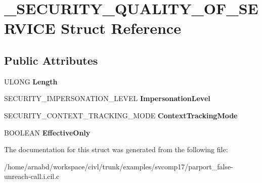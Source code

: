\hypertarget{struct__SECURITY__QUALITY__OF__SERVICE}{}\section{\+\_\+\+S\+E\+C\+U\+R\+I\+T\+Y\+\_\+\+Q\+U\+A\+L\+I\+T\+Y\+\_\+\+O\+F\+\_\+\+S\+E\+R\+V\+I\+C\+E Struct Reference}
\label{struct__SECURITY__QUALITY__OF__SERVICE}
\subsection*{Public Attributes}
\begin{DoxyCompactItemize}
\item 
\hypertarget{struct__SECURITY__QUALITY__OF__SERVICE_a8f4e4ca9a25a61e46d5a7bc754f3fb25}{}U\+L\+O\+N\+G {\bfseries Length}\label{struct__SECURITY__QUALITY__OF__SERVICE_a8f4e4ca9a25a61e46d5a7bc754f3fb25}

\item 
\hypertarget{struct__SECURITY__QUALITY__OF__SERVICE_ae0193db9a6f380415db53c5bc702b4e3}{}S\+E\+C\+U\+R\+I\+T\+Y\+\_\+\+I\+M\+P\+E\+R\+S\+O\+N\+A\+T\+I\+O\+N\+\_\+\+L\+E\+V\+E\+L {\bfseries Impersonation\+Level}\label{struct__SECURITY__QUALITY__OF__SERVICE_ae0193db9a6f380415db53c5bc702b4e3}

\item 
\hypertarget{struct__SECURITY__QUALITY__OF__SERVICE_a3501dda7ede19670b2b46138cc82707f}{}S\+E\+C\+U\+R\+I\+T\+Y\+\_\+\+C\+O\+N\+T\+E\+X\+T\+\_\+\+T\+R\+A\+C\+K\+I\+N\+G\+\_\+\+M\+O\+D\+E {\bfseries Context\+Tracking\+Mode}\label{struct__SECURITY__QUALITY__OF__SERVICE_a3501dda7ede19670b2b46138cc82707f}

\item 
\hypertarget{struct__SECURITY__QUALITY__OF__SERVICE_ac099321a3499f22a14c36b43ae5fcaf1}{}B\+O\+O\+L\+E\+A\+N {\bfseries Effective\+Only}\label{struct__SECURITY__QUALITY__OF__SERVICE_ac099321a3499f22a14c36b43ae5fcaf1}

\end{DoxyCompactItemize}


The documentation for this struct was generated from the following file\+:\begin{DoxyCompactItemize}
\item 
/home/arnabd/workspace/civl/trunk/examples/svcomp17/parport\+\_\+false-\/unreach-\/call.\+i.\+cil.\+c\end{DoxyCompactItemize}
